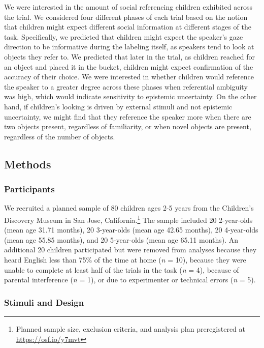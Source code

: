 \documentclass[10pt, letterpaper]{article}
\begin{document}
We were interested in the amount of social referencing children
exhibited across the trial. We considered four different phases of each
trial based on the notion that children might expect different social
information at different stages of the task. Specifically, we predicted
that children might expect the speaker's gaze direction to be
informative during the labeling itself, as speakers tend to look at
objects they refer to. We predicted that later in the trial, as children
reached for an object and placed it in the bucket, children might expect
confirmation of the accuracy of their choice. We were interested in
whether children would reference the speaker to a greater degree across
these phases when referential ambiguity was high, which would indicate
sensitivity to epistemic uncertainty. On the other hand, if children's
looking is driven by external stimuli and not epistemic uncertainty, we
might find that they reference the speaker more when there are two
objects present, regardless of familiarity, or when novel objects are
present, regardless of the number of objects.

\subsection{Methods}\label{methods}

\subsubsection{Participants}\label{participants}

We recruited a planned sample of 80 children ages 2-5 years from the
Children's Discovery Museum in San Jose, California.\footnote{Planned
  sample size, exclusion criteria, and analysis plan preregistered at
  \url{https://osf.io/y7mvt}} The sample included 20 2-year-olds (mean
age 31.71 months), 20 3-year-olds (mean age 42.65 months), 20
4-year-olds (mean age 55.85 months), and 20 5-year-olds (mean age 65.11
months). An additional 20 children participated but were removed from
analyses because they heard English less than 75\% of the time at home
(\emph{n} = 10), because they were unable to complete at least half of
the trials in the task (\emph{n} = 4), because of parental interference
(\emph{n} = 1), or due to experimenter or technical errors (\emph{n} =
5).

\subsubsection{Stimuli and Design}\label{stimuli-and-design}
\end{document}
